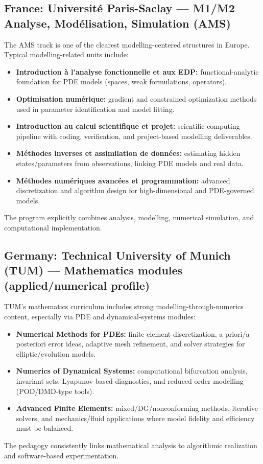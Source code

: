 ﻿\documentclass[11pt,a4paper]{article}
\begin{document}
\subsection*{France: Universit\'e Paris-Saclay --- M1/M2 Analyse, Mod\'elisation, Simulation (AMS)}
The AMS track is one of the clearest modelling-centered structures in Europe. Typical modelling-related units include:
\begin{itemize}[leftmargin=*]
  \item \textbf{Introduction \`a l'analyse fonctionnelle et aux EDP:} functional-analytic foundation for PDE models (spaces, weak formulations, operators).
  \item \textbf{Optimisation num\'erique:} gradient and constrained optimization methods used in parameter identification and model fitting.
  \item \textbf{Introduction au calcul scientifique et projet:} scientific computing pipeline with coding, verification, and project-based modelling deliverables.
  \item \textbf{M\'ethodes inverses et assimilation de donn\'ees:} estimating hidden states/parameters from observations, linking PDE models and real data.
  \item \textbf{M\'ethodes num\'eriques avanc\'ees et programmation:} advanced discretization and algorithm design for high-dimensional and PDE-governed models.
\end{itemize}
The program explicitly combines analysis, modelling, numerical simulation, and computational implementation.

\subsection*{Germany: Technical University of Munich (TUM) --- Mathematics modules (applied/numerical profile)}
TUM's mathematics curriculum includes strong modelling-through-numerics content, especially via PDE and dynamical-systems modules:
\begin{itemize}[leftmargin=*]
  \item \textbf{Numerical Methods for PDEs:} finite element discretization, a priori/a posteriori error ideas, adaptive mesh refinement, and solver strategies for elliptic/evolution models.
  \item \textbf{Numerics of Dynamical Systems:} computational bifurcation analysis, invariant sets, Lyapunov-based diagnostics, and reduced-order modelling (POD/DMD-type tools).
  \item \textbf{Advanced Finite Elements:} mixed/DG/nonconforming methods, iterative solvers, and mechanics/fluid applications where model fidelity and efficiency must be balanced.
\end{itemize}
The pedagogy consistently links mathematical analysis to algorithmic realization and software-based experimentation.
\end{document}
